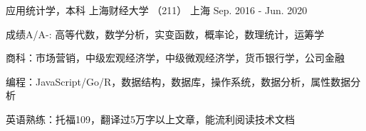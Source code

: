 

\begin{cventries}

  \cventry
    {应用统计学，本科} %
    {上海财经大学 （211）} %
    {上海} %
    {Sep. 2016 - Jun. 2020} %
    {
      \begin{cvitems} %
        \item {成绩A/A-:   高等代数，数学分析，实变函数，概率论，数理统计，运筹学}
        \item {商科：市场营销，中级宏观经济学，中级微观经济学，货币银行学，公司金融}
        \item {编程：JavaScript/Go/R，数据结构，数据库，操作系统，数据分析，属性数据分析}
        \item {英语熟练：托福109，翻译过5万字以上文章，能流利阅读技术文档}
      \end{cvitems}
    }

\end{cventries}


